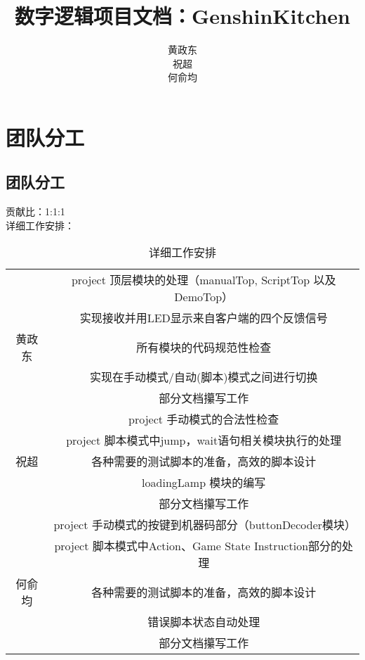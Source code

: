 \documentclass[12pt, a4paper]{ctexart}
\title{数字逻辑项目文档：GenshinKitchen}
\author{黄政东\\祝超\\何俞均}
\date{}
\begin{document}
\maketitle

\newpage
\section{团队分工}
\subsection{团队分工}
贡献比：1:1:1\\
详细工作安排：
\begin{table}[h]
	\centering
	\begin{tabular}{|c|c|}
		\hline
		~      & project 顶层模块的处理（manualTop, ScriptTop 以及 DemoTop） \\
		\cline{2-2}
		~      & 实现接收并用LED显示来自客户端的四个反馈信号                 \\
		\cline{2-2}
		黄政东 & 所有模块的代码规范性检查                                    \\
		\cline{2-2}
		~      & 实现在手动模式/自动(脚本)模式之间进行切换                   \\
		\cline{2-2}
		~      & 部分文档攥写工作                                            \\
		\hline

		~      & project 手动模式的合法性检查                                \\
		\cline{2-2}
		~      & project 脚本模式中jump，wait语句相关模块执行的处理          \\
		\cline{2-2}
		祝超   & 各种需要的测试脚本的准备，高效的脚本设计                    \\
		\cline{2-2}
		~      & loadingLamp 模块的编写                                      \\
		\cline{2-2}
		~      & 部分文档攥写工作                                            \\

		\hline
		~      & project 手动模式的按键到机器码部分（buttonDecoder模块）     \\
		\cline{2-2}
		~      & project 脚本模式中Action、Game State Instruction部分的处理  \\
		\cline{2-2}
		何俞均 & 各种需要的测试脚本的准备，高效的脚本设计                    \\
		\cline{2-2}
		~      & 错误脚本状态自动处理                                        \\
		\cline{2-2}
		~      & 部分文档攥写工作                                            \\
		\hline
	\end{tabular}
	\caption{详细工作安排}
\end{table}
\end{document}

